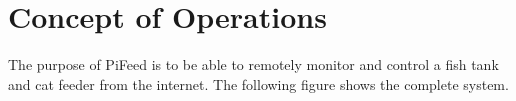 




\usepackage[compact]{titlesec}





\section{Concept of Operations}
The purpose of PiFeed is to be able to remotely monitor and control a fish tank
and cat feeder from the internet. The following figure shows the complete
system.

